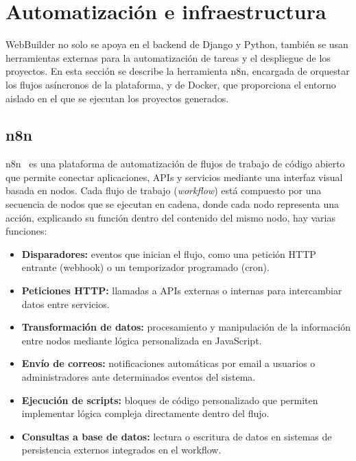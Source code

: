 \section{Automatización e infraestructura}
\label{sec:auto}

WebBuilder no solo se apoya en el backend de Django y Python, también se usan herramientas externas para la automatización de tareas y el despliegue de los proyectos. En esta sección se describe la herramienta n8n, encargada de orquestar los flujos asíncronos de la plataforma, y de Docker, que proporciona el entorno aislado en el que se ejecutan los proyectos generados.


\subsection{n8n}
\label{subsec:n8n}

n8n~\cite{n8n_docs} es una plataforma de automatización de flujos de trabajo de código abierto que permite conectar aplicaciones, APIs y servicios mediante una interfaz visual basada en nodos. Cada flujo de trabajo (\emph{workflow}) está compuesto por una secuencia de nodos que se ejecutan en cadena, donde cada nodo representa una acción, explicando su función dentro del contenido del mismo nodo, hay varias funciones: 

\begin{itemize}
    \item \textbf{Disparadores:} eventos que inician el flujo, como una 
    petición HTTP entrante (webhook) o un temporizador programado (cron).
    \item \textbf{Peticiones HTTP:} llamadas a APIs externas o internas para 
    intercambiar datos entre servicios.
    \item \textbf{Transformación de datos:} procesamiento y manipulación de 
    la información entre nodos mediante lógica personalizada en JavaScript.
    \item \textbf{Envío de correos:} notificaciones automáticas por email 
    a usuarios o administradores ante determinados eventos del sistema.
    \item \textbf{Ejecución de scripts:} bloques de código personalizado 
    que permiten implementar lógica compleja directamente dentro del flujo.
    \item \textbf{Consultas a base de datos:} lectura o escritura de datos 
    en sistemas de persistencia externos integrados en el workflow.
\end{itemize}

